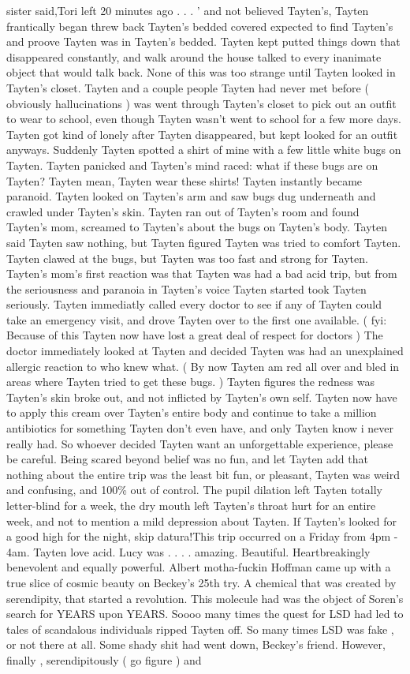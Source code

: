 \documentclass[12pt]{book}
\begin{document}
sister said,Tori left 20 minutes ago . . .  ' and not believed Tayten's, Tayten frantically began threw back Tayten's bedded covered expected to find Tayten's and proove Tayten was in Tayten's bedded. Tayten kept putted things down that disappeared constantly, and walk around the house talked to every inanimate object that would talk back. None of this was too strange until Tayten looked in Tayten's closet. Tayten and a couple people Tayten had never met before ( obviously hallucinations ) was went through Tayten's closet to pick out an outfit to wear to school, even though Tayten wasn't went to school for a few more days. Tayten got kind of lonely after Tayten disappeared, but kept looked for an outfit anyways. Suddenly Tayten spotted a shirt of mine with a few little white bugs on Tayten. Tayten panicked and Tayten's mind raced: what if these bugs are on Tayten? Tayten mean, Tayten wear these shirts! Tayten instantly became paranoid. Tayten looked on Tayten's arm and saw bugs dug underneath and crawled under Tayten's skin. Tayten ran out of Tayten's room and found Tayten's mom, screamed to Tayten's about the bugs on Tayten's body. Tayten said Tayten saw nothing, but Tayten figured Tayten was tried to comfort Tayten. Tayten clawed at the bugs, but Tayten was too fast and strong for Tayten. Tayten's mom's first reaction was that Tayten was had a bad acid trip, but from the seriousness and paranoia in Tayten's voice Tayten started took Tayten seriously. Tayten immediatly called every doctor to see if any of Tayten could take an emergency visit, and drove Tayten over to the first one available. ( fyi: Because of this Tayten now have lost a great deal of respect for doctors ) The doctor immediately looked at Tayten and decided Tayten was had an unexplained allergic reaction to who knew what. ( By now Tayten am red all over and bled in areas where Tayten tried to get these bugs. ) Tayten figures the redness was Tayten's skin broke out, and not inflicted by Tayten's own self. Tayten now have to apply this cream over Tayten's entire body and continue to take a million antibiotics for something Tayten don't even have, and only Tayten know i never really had. So whoever decided Tayten want an unforgettable experience, please be careful. Being scared beyond belief was no fun, and let Tayten add that nothing about the entire trip was the least bit fun, or pleasant, Tayten was weird and confusing, and 100\% out of control. The pupil dilation left Tayten totally letter-blind for a week, the dry mouth left Tayten's throat hurt for an entire week, and not to mention a mild depression about Tayten. If Tayten's looked for a good high for the night, skip datura!This trip occurred on a Friday from 4pm - 4am. Tayten love acid. Lucy was  . . .  . amazing. Beautiful. Heartbreakingly benevolent and equally powerful. Albert motha-fuckin Hoffman came up with a true slice of cosmic beauty on Beckey's 25th try. A chemical that was created by serendipity, that started a revolution. This molecule had was the object of Soren's search for YEARS upon YEARS. Soooo many times the quest for LSD had led to tales of scandalous individuals ripped Tayten off. So many times LSD was fake , or not there at all. Some shady shit had went down, Beckey's friend. However, finally , serendipitously ( go figure ) and 
\end{document}
